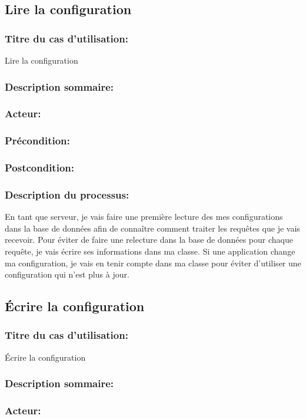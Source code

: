 \documentclass{scrreprt}
\begin{document}
\subsection{Lire la configuration}
\subsubsection{Titre du cas d'utilisation:} Lire la configuration
\subsubsection{Description sommaire:}
\subsubsection{Acteur:}
\subsubsection{Précondition:}
\subsubsection{Postcondition:}
\subsubsection{Description du processus:}En tant que serveur, je vais faire une première lecture des mes configurations
dans la base de données afin de connaître comment traiter les requêtes que je
vais recevoir.
Pour éviter de faire une relecture dans la base de données pour chaque requête,
je vais écrire ses informations dans ma classe.
Si une application change ma configuration, je vais en tenir compte dans ma
classe pour éviter d'utiliser une configuration qui n'est plus à jour.

\subsection{Écrire la configuration}
\subsubsection{Titre du cas d'utilisation:} Écrire la configuration
\subsubsection{Description sommaire:}
\subsubsection{Acteur:}
\end{document}
